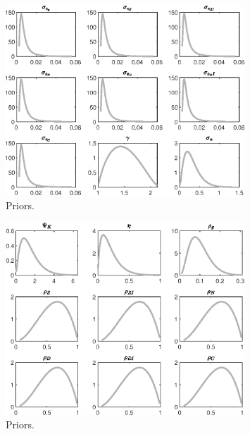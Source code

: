  
\begin{figure}[H]
\centering
\includegraphics[width=0.80\textwidth]{BRS_pred_labor/graphs/BRS_pred_labor_Priors1}
\caption{Priors.}\label{Fig:Priors:1}
\end{figure}
\begin{figure}[H]
\centering
\includegraphics[width=0.80\textwidth]{BRS_pred_labor/graphs/BRS_pred_labor_Priors2}
\caption{Priors.}\label{Fig:Priors:2}
\end{figure}
 
